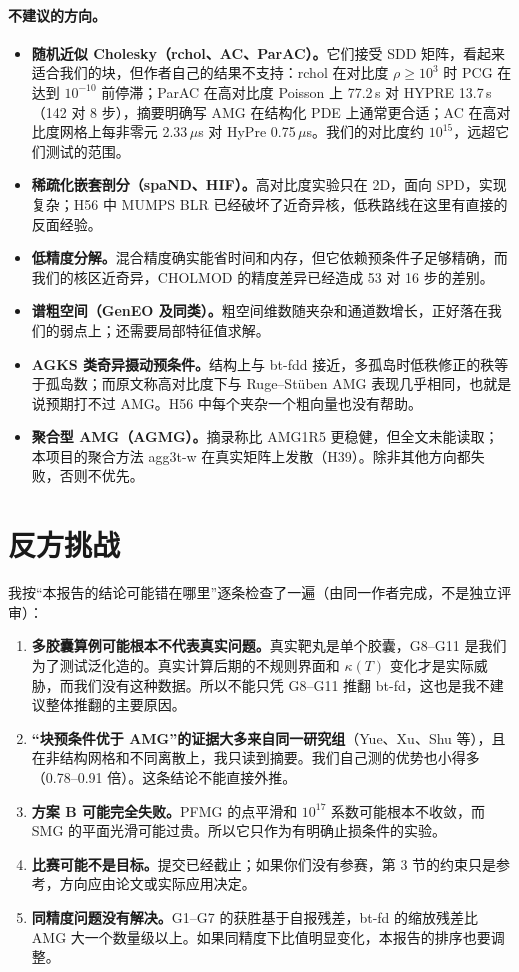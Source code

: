 \documentclass[11pt,a4paper]{ctexart}
\begin{document}
\paragraph{不建议的方向。}
\begin{itemize}
\item \textbf{随机近似 Cholesky（rchol、AC、ParAC）。}它们接受 SDD 矩阵，看起来适合我们的块，但作者自己的结果不支持：rchol 在对比度 $\rho\ge10^{3}$ 时 PCG 在达到 $10^{-10}$ 前停滞\cite{rchol}；ParAC 在高对比度 Poisson 上 77.2\,s 对 HYPRE 13.7\,s（142 对 8 步），摘要明确写 AMG 在结构化 PDE 上通常更合适\cite{parac}；AC 在高对比度网格上每非零元 2.33\,$\mu$s 对 HyPre 0.75\,$\mu$s\cite{gao2023}。我们的对比度约 $10^{15}$，远超它们测试的范围。
\item \textbf{稀疏化嵌套剖分（spaND、HIF）。}高对比度实验只在 2D\cite{spand}，面向 SPD，实现复杂；H56 中 MUMPS BLR 已经破坏了近奇异核，低秩路线在这里有直接的反面经验。
\item \textbf{低精度分解。}混合精度确实能省时间和内存\cite{amestoy2023}，但它依赖预条件子足够精确，而我们的核区近奇异，CHOLMOD 的精度差异已经造成 53 对 16 步的差别。
\item \textbf{谱粗空间（GenEO 及同类）。}粗空间维数随夹杂和通道数增长\cite{galvis2010,spillane2014}，正好落在我们的弱点上；还需要局部特征值求解。
\item \textbf{AGKS 类奇异摄动预条件。}结构上与 bt-fdd 接近，多孤岛时低秩修正的秩等于孤岛数\cite{aksoylu2009}；而原文称高对比度下与 Ruge--St\"uben AMG 表现几乎相同\cite{agks2008}，也就是说预期打不过 AMG。H56 中每个夹杂一个粗向量也没有帮助。
\item \textbf{聚合型 AMG（AGMG）。}摘录称比 AMG1R5 更稳健\cite{notay2010}，但全文未能读取；本项目的聚合方法 agg3t-w 在真实矩阵上发散（H39）。除非其他方向都失败，否则不优先。
\end{itemize}

\section{反方挑战}
我按“本报告的结论可能错在哪里”逐条检查了一遍（由同一作者完成，不是独立评审）：
\begin{enumerate}
\item \textbf{多胶囊算例可能根本不代表真实问题。}真实靶丸是单个胶囊，G8--G11 是我们为了测试泛化造的。真实计算后期的不规则界面和 $\kappa(T)$ 变化才是实际威胁，而我们没有这种数据。所以不能只凭 G8--G11 推翻 bt-fd，这也是我不建议整体推翻的主要原因。
\item \textbf{“块预条件优于 AMG”的证据大多来自同一研究组}（Yue、Xu、Shu 等），且在非结构网格和不同离散上，我只读到摘要。我们自己测的优势也小得多（0.78--0.91 倍）。这条结论不能直接外推。
\item \textbf{方案 B 可能完全失败。}PFMG 的点平滑和 $10^{17}$ 系数可能根本不收敛，而 SMG 的平面光滑可能过贵。所以它只作为有明确止损条件的实验。
\item \textbf{比赛可能不是目标。}提交已经截止；如果你们没有参赛，第 3 节的约束只是参考，方向应由论文或实际应用决定。
\item \textbf{同精度问题没有解决。}G1--G7 的获胜基于自报残差，bt-fd 的缩放残差比 AMG 大一个数量级以上。如果同精度下比值明显变化，本报告的排序也要调整。
\end{enumerate}
\end{document}
